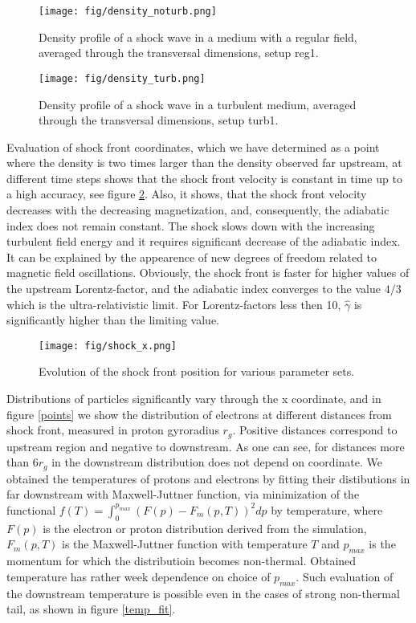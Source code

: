 \documentclass[a4paper]{jpconf}
\begin{document}
	\begin{figure}[h!]
		\centering
		\begin{minipage}{0.49\textwidth}
			\centering
			\texttt{[image: fig/density\_noturb.png]} 
			\caption{Density profile of a shock wave in a medium with a regular field, averaged through the transversal dimensions, setup reg1.}
			\label{density_noturb}
		\end{minipage}\hfill
		\begin{minipage}{0.49\textwidth}
			\centering
			\texttt{[image: fig/density\_turb.png]} 
			\caption{Density profile of a shock wave in a turbulent medium, averaged through the transversal dimensions, setup turb1.}
			\label{density_turb}
		\end{minipage}
	\end{figure}
	
	Evaluation of shock front coordinates, which we have determined as a point where  the density is two times larger than the density observed far upstream, at different time steps shows that the shock front velocity is constant in time up to a high accuracy, see figure \ref{shock_x}. Also, it shows, that the shock front velocity decreases with the decreasing magnetization, and, consequently, the adiabatic index does not remain constant. The shock slows down with the increasing turbulent field energy and it requires significant decrease of the adiabatic index. It can be explained by the appearence of new degrees of freedom related to magnetic field oscillations. Obviously, the shock front is faster for higher values of the upstream Lorentz-factor, and the adiabatic index  converges to the value $4/3$ which is the ultra-relativistic limit. For Lorentz-factors less then 10, $\hat{\gamma}$ is significantly higher than the limiting value. 
	
	
	\begin{figure}[h!]
		\centering
		\texttt{[image: fig/shock\_x.png]} 
		\caption{Evolution of the shock front position for various parameter sets.}
		\label{shock_x}
	\end{figure}
	
	Distributions of particles significantly vary through the x coordinate, and in figure \ref{points} we show the distribution of electrons at different distances from shock front, measured in proton gyroradius $r_g$. Positive distances correspond to upstream region and negative to downstream. As one can see, for distances more than $6 r_g$ in the downstream distribution does not depend on coordinate.  We obtained the temperatures of protons and electrons by fitting their distibutions in far downstream with Maxwell-Juttner function, via minimization of the functional $f(T) = \int_{0}^{p_{max}} (F(p) - F_{m}(p,T))^2dp$ by temperature, where $F(p)$ is the electron or proton distribution derived from the simulation, $F_{m}(p,T)$ is the Maxwell-Juttner function with temperature $T$ and $p_{max}$ is the momentum for which the distributioin becomes non-thermal. Obtained temperature has rather week dependence on choice of $p_{max}$. Such evaluation of the downstream temperature is possible even in the cases of strong non-thermal tail, as shown in figure \ref{temp_fit}.
	
\end{document}
